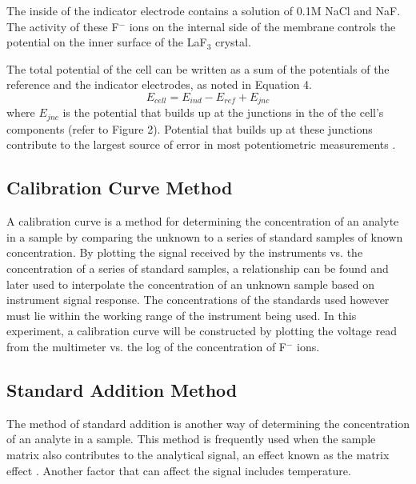 \documentclass[journal=jacsat,manuscript=article,layout=twocolumn]{achemso}
\begin{document}
The inside of the indicator electrode contains a solution of 0.1M NaCl and NaF.
The activity of these F$^-$ ions on the internal side of the membrane controls
the potential on the inner surface of the LaF$_3$ crystal.

The total potential of the cell can be written as a sum of the potentials of the
reference and the indicator electrodes, as noted in Equation 4.
\begin{equation}
    E_{cell} = E_{ind} - E_{ref} + E_{jnc}
\end{equation}
where $E_{jnc}$ is the potential that builds up at the junctions in the
of the cell's components (refer to Figure 2). Potential that builds up at these
junctions contribute to the largest source of error in most potentiometric
measurements \cite{nmt}.

\subsection {Calibration Curve Method}
A calibration curve is a method for determining the concentration of an analyte
in a sample by comparing the unknown to a series of standard samples of known
concentration. By plotting the signal received by the instruments vs. the concentration of a series of standard samples, a relationship can be found and
later used to interpolate the concentration of an unknown sample based on
instrument signal response. The concentrations of the standards used however
must lie within the working range of the instrument being used. In this
experiment, a calibration curve will be constructed by plotting the voltage read
from the multimeter vs. the log of the concentration of F$^-$ ions.

\subsection {Standard Addition Method}
The method of standard addition is another way of determining the concentration
of an analyte in a sample. This method is frequently used when the sample matrix
also contributes to the analytical signal, an effect known as the matrix effect
\cite{Harris}. Another factor that can affect the signal includes temperature.
\end{document}
